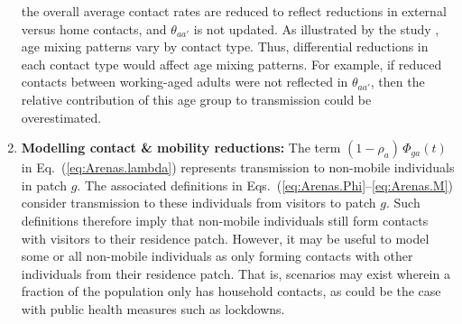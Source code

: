 \begin{enumerate}
  the overall average contact rates are reduced to reflect reductions in external versus home contacts, and
  $\theta_{aa'}$ is not updated.
  As illustrated by the \polymod study \cite{Mossong2008}, age mixing patterns vary by contact type.
  Thus, differential reductions in each contact type would affect age mixing patterns.
  For example, if reduced contacts between working-aged adults were not reflected in $\theta_{aa'}$,
  then the relative contribution of this age group to transmission could be overestimated.
  \item \textbf{Modelling contact \& mobility reductions:}\label{issue:mobility}
  The term $(1-\rho_a)\,\Phi_{ga}(t)$ in Eq.~(\ref{eq:Arenas.lambda})
  represents transmission to non-mobile individuals in patch $g$.
  The associated definitions in Eqs.~(\ref{eq:Arenas.Phi}--\ref{eq:Arenas.M})
  consider transmission to these individuals from visitors to patch $g$.
  Such definitions therefore imply that
  non-mobile individuals still form contacts with visitors to their residence patch.
  However, it may be useful to model some or all non-mobile individuals
  as only forming contacts with other individuals from their residence patch.
  That is, scenarios may exist wherein a fraction of the population only has
  household contacts, as could be the case with public health measures such as lockdowns.

\end{enumerate}
